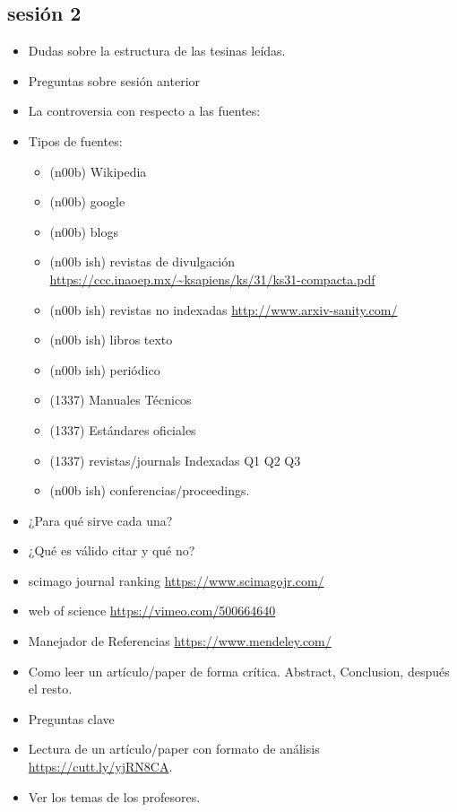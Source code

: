 \documentclass[letterpaper, 10 pt, conference]{ieeeconf}  %
\begin{document}
\subsection{sesión 2}
\begin{itemize}
		\item Dudas sobre la estructura de las tesinas leídas.
		\item Preguntas sobre sesión anterior 
		\item La controversia con respecto a las fuentes: \cite{news} 
        \item Tipos de fuentes:
        \begin{itemize} 
        		\item  (n00b) Wikipedia
                \item  (n00b) google
           		\item  (n00b) blogs
                \item  (n00b ish) revistas de divulgación  \url{https://ccc.inaoep.mx/~ksapiens/ks/31/ks31-compacta.pdf}
				\item  (n00b ish) revistas no indexadas \url{http://www.arxiv-sanity.com/}
				\item  (n00b ish) libros texto \cite{book1}
            	\item  (n00b ish) periódico \cite{news}
                \item  (1337) Manuales Técnicos \cite{Manual-Esp1}
                \item  (1337) Estándares oficiales \cite{Manual-Esp1}
                \item  (1337) revistas/journals Indexadas Q1 Q2 Q3 \cite{journal1}
                \item  (n00b ish) conferencias/proceedings. \cite{conference1}
        \end{itemize}
		\item ¿Para qué sirve cada una?
		\item ¿Qué es válido citar y qué no?
		\item scimago journal ranking \url{https://www.scimagojr.com/}
		\item web of science \url{https://vimeo.com/500664640}
		\item Manejador de Referencias \url{https://www.mendeley.com/}
		\item Como leer un artículo/paper de forma crítica. Abstract, Conclusion, después el resto.
		\item Preguntas clave
		\item Lectura de un artículo/paper con formato de análisis \url{https://cutt.ly/yjRN8CA}. 
		\item Ver los temas de los profesores.
\end{itemize}
\end{document}
